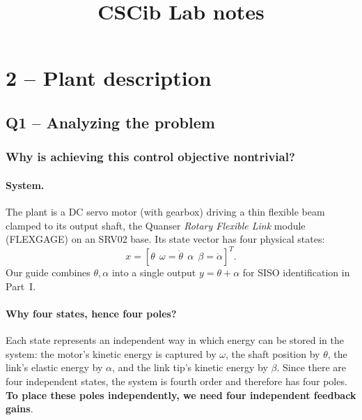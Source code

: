 \documentclass[a4paper,11pt]{article}
\title{CSCib Lab notes}
\author{}
\date{}
\begin{document}
\maketitle

\section*{2 -- Plant description}

\subsection*{Q1 -- Analyzing the problem}
\label{sec:q1}

\subsubsection*{Why is achieving this control objective nontrivial?}


\vspace{6pt}

\paragraph{System.}
The plant is a DC servo motor (with gearbox) driving a thin flexible beam clamped to its output
shaft, the Quanser \emph{Rotary Flexible Link} module (FLEXGAGE) on an SRV02 base. Its state vector has four physical states:
$$x = [\theta \ \ \omega{=}\dot\theta \ \ \alpha \ \ \beta{=}\dot\alpha]^T.$$
Our guide combines $\theta,\alpha$ into a single output $y=\theta+\alpha$ for SISO identification
in Part~I.
\paragraph{Why four states, hence four poles?}
Each state represents an independent way in which energy can be stored in the system: the motor's kinetic energy is captured by $\omega$, the shaft position by $\theta$, the link's elastic energy by $\alpha$, and the link tip's kinetic energy by $\beta$. Since there are four independent states, the system is fourth order and therefore has four poles. \textbf{To place these poles independently, we need four independent feedback gains}.
\end{document}

